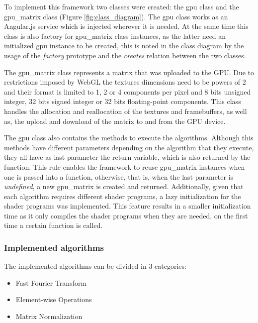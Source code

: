         To implement this framework two classes were created: the gpu class and the gpu\_matrix class (Figure \ref{fig:class_diagram}). The gpu class works as an Angular.js service which is injected wherever it is needed. At the same time this class is also factory for gpu\_matrix class instances, as the latter need an initialized gpu instance to be created, this is noted in the class diagram by the usage of the \textit{factory} prototype and the \textit{creates} relation between the two classes.
        
        The gpu\_matrix class represents a matrix that was uploaded to the GPU. Due to restrictions imposed by WebGL the textures dimensions need to be powers of 2 and their format is limited to 1, 2 or 4 components per pixel and 8 bits unsigned integer, 32 bits signed integer or 32 bits floating-point components. This class handles the allocation and reallocation of the textures and framebuffers, as well as, the upload and download of the matrix to and from the GPU device.
        
        The gpu class also contains the methods to execute the algorithms. Although this methods have different parameters depending on the algorithm that they execute, they all have as last parameter the return variable, which is also returned by the function. This rule enables the framework to reuse gpu\_matrix instances when one is passed into a function, otherwise, that is, when the last parameter is \textit{undefined}, a new gpu\_matrix is created and returned. Additionally, given that each algorithm requires different shader programs, a lazy initialization for the shader programs was implemented. This feature results in a smaller initialization time as it only compiles the shader programs when they are needed, on the first time a certain function is called.
      
	  \subsubsection{Implemented algorithms}
	  
	    The implemented algorithms can be divided in 3 categories:
	    \begin{itemize}
	      \item Fast Fourier Transform
	      \item Element-wise Operations
	      \item Matrix Normalization
	    \end{itemize}
	    
